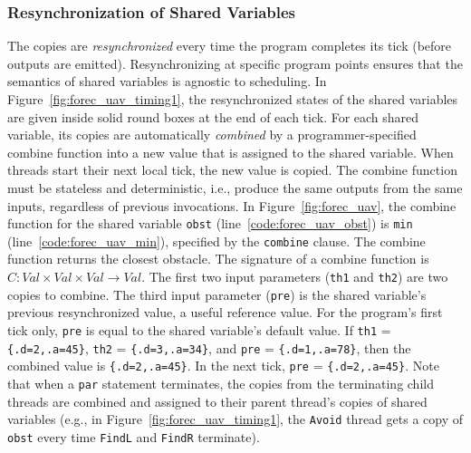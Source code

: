 \subsubsection{Resynchronization of Shared Variables}
\label{sec:forec_shared_variables_resync}
The copies are \emph{resynchronized} every time the program 
completes its tick (before outputs are emitted). Resynchronizing 
at specific program points ensures that the semantics of shared 
variables is agnostic to scheduling.
In Figure~\ref{fig:forec_uav_timing1},
the resynchronized states of the shared variables are given
inside solid round boxes at the end of each tick. For each
shared variable, its copies are automatically
\emph{combined} by a programmer-specified combine function
into a new value that is assigned to the shared variable.
When threads start their next local tick, the new value is
copied. The combine function must be stateless and
deterministic, i.e., produce the same outputs from the same
inputs, regardless of previous invocations. In
Figure~\ref{fig:forec_uav}, the combine function for
the shared variable \verb$obst$
(line~\ref{code:forec_uav_obst}) is \verb$min$
(line~\ref{code:forec_uav_min}), specified by the
\verb$combine$ clause. The combine function returns 
the closest obstacle.
The signature of a combine function is 
$\mathit{C}: \mathit{Val} \times \mathit{Val} \times \mathit{Val} \to \mathit{Val}$. 
The first two input parameters (\verb$th1$ and \verb$th2$) are two
copies to combine. The third input parameter (\verb$pre$) is
the shared variable's previous resynchronized value, a useful
reference value. For the program's first tick only, \verb$pre$
is equal to the shared variable's default value. 
If \verb$th1$ = \verb${.d=2,.a=45}$, 
\verb$th2$ = \verb${.d=3,.a=34}$, and
\verb$pre$ = \verb${.d=1,.a=78}$, then the combined value
is \verb${.d=2,.a=45}$. In the next tick, 
\verb$pre$ = \verb${.d=2,.a=45}$.
Note that when a \verb$par$ statement terminates, the copies
from the terminating child threads are combined and
assigned to their parent thread's copies of shared variables
(e.g., in Figure~\ref{fig:forec_uav_timing1}, the \verb$Avoid$
thread gets a copy of \verb$obst$ every time \verb$FindL$ and 
\verb$FindR$ terminate).

